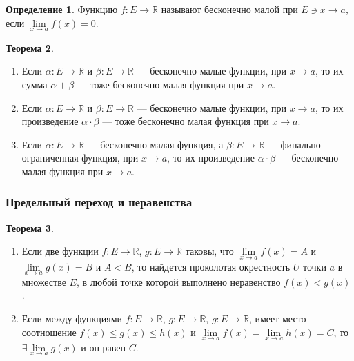 \documentclass[12pt]{report}
\theoremstyle{definition}
\newtheorem{theorem}{Теорема}[chapter]
\newtheorem{definition}[theorem]{Определение}
\newcommand{\R}{\mathbb R}
\begin{document}
\begin{definition}
  Функцию $f: E \rightarrow \R$ называют бесконечно малой при $E \ni x \rightarrow a$,
  если $\lim\limits_{x\rightarrow a} f(x) = 0$.
\end{definition}

\begin{theorem}
\begin{enumerate}
  \item Если $\alpha: E \rightarrow \R$ и $\beta: E \rightarrow \R$ --- бесконечно малые функции,
    при $x \rightarrow a$, то их сумма $\alpha + \beta$ --- тоже бесконечно малая функция при $x \rightarrow a$.
  \item Если $\alpha: E \rightarrow \R$ и $\beta: E \rightarrow \R$ --- бесконечно малые функции,
    при $x \rightarrow a$, то их произведение $\alpha \cdot \beta$ --- тоже бесконечно малая функция при $x \rightarrow a$.
  \item Если $\alpha: E \rightarrow \R$ --- бесконечно малая функция,
    а $\beta: E \rightarrow \R$ --- финально ограниченная функция,
    при $x \rightarrow a$, то их произведение $\alpha \cdot \beta$ --- бесконечно малая функция при $x \rightarrow a$.
\end{enumerate}
\end{theorem}

\subsubsection{Предельный переход и неравенства}
\begin{theorem}
  \begin{enumerate}
    \item  Если две функции $f: E \rightarrow \R$, $g: E \rightarrow \R$ таковы,
      что $\lim\limits_{x\rightarrow a} f(x) = A$ и $\lim\limits_{x\rightarrow a} g(x) = B$ и
      $A < B$, то найдется проколотая окрестность $U$ точки $a$ в множестве $E$, в любой
      точке которой выполнено неравенство $f(x) < g(x)$.
    \item  Если между функциями  $f: E \rightarrow \R$, $g: E \rightarrow \R$, $g: E \rightarrow \R$,
      имеет место соотношение $f(x) \le g(x) \le h(x)$ и
      $\lim\limits_{x\rightarrow a} f(x) = \lim\limits_{x\rightarrow a} h(x) = C$,
      то $\exists \lim\limits_{x\rightarrow a} g(x)$ и он равен $C$.
  \end{enumerate}
\end{theorem}

\end{document}
